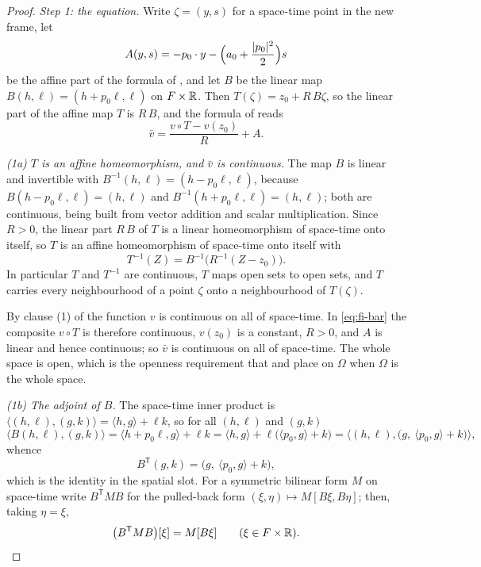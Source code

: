 \begin{proof}
\emph{Step 1: the equation.} Write $\zeta=(y,s)$ for a space-time point in the
new frame, let
\[
  A(y,s)=-p_0\cdot y-\Bigl(a_0+\frac{|p_0|^2}2\Bigr)s
\]
be the affine part of the formula of , and let $B$ be the
linear map $B(h,\ell)=(h+p_0\ell,\ell)$ on $F\times\mathbb{R}$. Then
$T(\zeta)=z_0+R\,B\zeta$, so the linear part of the affine map $T$ is $R\,B$, and
the formula of  reads
\begin{equation}\label{eq:fi-bar}
  \bar v=\frac{v\circ T-v(z_0)}R+A .
\end{equation}

\emph{(1a) $T$ is an affine homeomorphism, and $\bar v$ is continuous.}
The map $B$ is linear and invertible with $B^{-1}(h,\ell)=(h-p_0\ell,\ell)$,
because $B(h-p_0\ell,\ell)=(h,\ell)$ and $B^{-1}(h+p_0\ell,\ell)=(h,\ell)$; both
are continuous, being built from vector addition and scalar multiplication.
Since $R>0$,
the linear part $R\,B$ of $T$ is a linear homeomorphism of space-time onto
itself, so $T$ is an affine homeomorphism of space-time onto itself with
\[
  T^{-1}(Z)=B^{-1}\bigl(R^{-1}(Z-z_0)\bigr).
\]
In particular $T$ and $T^{-1}$ are continuous, $T$ maps open sets to open sets,
and $T$ carries every neighbourhood of a point $\zeta$ onto a neighbourhood of
$T(\zeta)$.

By clause (1) of  the function $v$ is continuous on all of
space-time. In \eqref{eq:fi-bar} the composite $v\circ T$ is therefore
continuous, $v(z_0)$ is a constant, $R>0$, and $A$ is linear and hence
continuous; so $\bar v$ is continuous on all of space-time. The whole space is
open, which is the openness requirement that  and
 place on $\Omega$ when $\Omega$ is the whole space.

\emph{(1b) The adjoint of $B$.}
The space-time inner product is
$\langle(h,\ell),(g,k)\rangle=\langle h,g\rangle+\ell k$, so for all $(h,\ell)$
and $(g,k)$
\[
  \bigl\langle B(h,\ell),(g,k)\bigr\rangle
   =\langle h+p_0\ell,g\rangle+\ell k
   =\langle h,g\rangle+\ell\bigl(\langle p_0,g\rangle+k\bigr)
   =\bigl\langle(h,\ell),\bigl(g,\ \langle p_0,g\rangle+k\bigr)\bigr\rangle ,
\]
whence
\begin{equation}\label{eq:fi-adjoint}
  B^{\mathsf T}(g,k)=\bigl(g,\ \langle p_0,g\rangle+k\bigr),
\end{equation}
which is the identity in the spatial slot. For a symmetric bilinear form $M$ on
space-time write $B^{\mathsf T}MB$ for the pulled-back form
$(\xi,\eta)\mapsto M[B\xi,B\eta]$; then, taking $\eta=\xi$,
\begin{equation}\label{eq:fi-quadform}
  \bigl(B^{\mathsf T}MB\bigr)[\xi]=M[B\xi]\qquad(\xi\in F\times\mathbb{R}).
\end{equation}


\end{proof}
